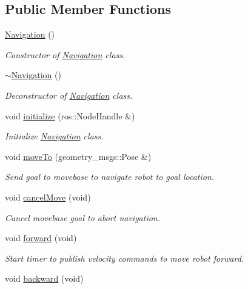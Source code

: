 \subsection*{Public Member Functions}
\begin{DoxyCompactItemize}
\item 
\hyperlink{classNavigation_a81fdffdefe46340da5fa6c570066b42b}{Navigation} ()
\begin{DoxyCompactList}\small\item\em Constructor of \hyperlink{classNavigation}{Navigation} class. \end{DoxyCompactList}\item 
\hyperlink{classNavigation_addd4022d716df48f4e55a1db69361ba7}{$\sim$\-Navigation} ()
\begin{DoxyCompactList}\small\item\em Deconstructor of \hyperlink{classNavigation}{Navigation} class. \end{DoxyCompactList}\item 
void \hyperlink{classNavigation_a216797e927d980c6ae3616894dd5cc22}{initialize} (ros\-::\-Node\-Handle \&)
\begin{DoxyCompactList}\small\item\em Initialize \hyperlink{classNavigation}{Navigation} class. \end{DoxyCompactList}\item 
void \hyperlink{classNavigation_a4a7991879f730a28e63a8cdd4a3f7689}{move\-To} (geometry\-\_\-msgs\-::\-Pose \&)
\begin{DoxyCompactList}\small\item\em Send goal to movebase to navigate robot to goal location. \end{DoxyCompactList}\item 
void \hyperlink{classNavigation_a658e2b394bd862802c7ea0ef3a6b34e1}{cancel\-Move} (void)
\begin{DoxyCompactList}\small\item\em Cancel movebase goal to abort navigation. \end{DoxyCompactList}\item 
void \hyperlink{classNavigation_a5b2dca2ac010096b68146dcb00c7259c}{forward} (void)
\begin{DoxyCompactList}\small\item\em Start timer to publish velocity commands to move robot forward. \end{DoxyCompactList}\item 
void \hyperlink{classNavigation_a44dda6e7326e9ac378d8af5eb9a4ff49}{backward} (void)

\end{DoxyCompactItemize}

